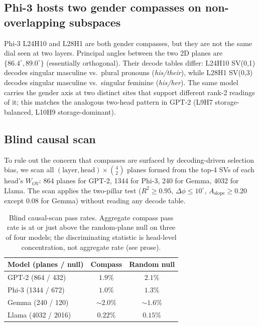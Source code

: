 \subsection{Phi-3 hosts two gender compasses on non-overlapping subspaces}
\label{sec:results:phi3two}

Phi-3 L24H10 and L28H1 are both gender compasses, but they are not
the same dial seen at two layers. Principal angles between the two
2D planes are $\{86.4^\circ, 89.0^\circ\}$ (essentially orthogonal).
Their decode tables differ: L24H10 SV(0,1) decodes singular
masculine vs.\ plural pronouns (\emph{his/their}), while L28H1 SV(0,3)
decodes singular masculine vs.\ singular feminine (\emph{his/her}).
The same model carries the gender axis at two distinct sites that
support different rank-2 readings of it; this matches the
analogous two-head pattern in GPT-2 (L9H7 storage-balanced, L10H9
storage-dominant).

\subsection{Blind causal scan}
\label{sec:results:scan}

To rule out the concern that compasses are surfaced by decoding-driven
selection bias, we scan all
$(\text{layer}, \text{head}) \times \binom{4}{2}$ planes formed from
the top-4 SVs of each head's $W_{OV}$: 864 planes for GPT-2, 1344
for Phi-3, 240 for Gemma, 4032 for Llama. The scan applies the
two-pillar test ($R^2 \geq 0.95$, $\Delta\phi \leq 10^\circ$,
$A_{\text{slope}} \geq 0.20$ except $0.08$ for Gemma) without
reading any decode table.

\begin{table}[t]
\centering
\small
\caption{Blind causal-scan pass rates. Aggregate compass pass rate
is at or just above the random-plane null on three of four models;
the discriminating statistic is head-level concentration, not
aggregate rate (see prose).}
\label{tab:scan}
\begin{tabular}{lcc}
\toprule
Model (planes / null) & Compass & Random null \\
\midrule
GPT-2 (864 / 432)         & $1.9\%$  & $2.1\%$ \\
Phi-3 (1344 / 672)        & $1.0\%$  & $1.3\%$ \\
Gemma (240 / 120)         & $\sim 2.0\%$ & $\sim 1.6\%$ \\
Llama (4032 / 2016)       & $0.22\%$ & $0.15\%$ \\
\bottomrule
\end{tabular}
\end{table}

